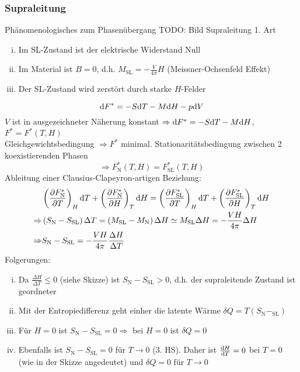 \subsubsection{Supraleitung}
Phänomenologisches zum Phasenübergang
TODO: Bild Supraleitung 1. Art  %
\begin{enumerate}[i)]
    \item Im SL-Zustand ist der elektrische Widerstand Null
    \item Im Material ist $B = 0$, d.h. $M_\text{SL} = - \frac{V}{4 \pi} H$ (Meissner-Ochsenfeld Effekt)
    \item Der SL-Zustand wird zerstört durch starke $H$-Felder
\end{enumerate}
\begin{equation}
    \mathrm{d} F^* = - S \mathrm{d} T - M \mathrm{d} H - p \mathrm{d} V
\end{equation}
$V$ ist in ausgezeichneter Näherung konstant $\Rightarrow \mathrm{d} F^* = - S \mathrm{d} T - M \mathrm{d} H$, $F^* = F^*(T, H)$ \\
Gleichgewichtsbedingung $\Rightarrow F^*$ minimal. Stationaritätsbedingung zwischen 2 koexistierenden Phasen
\begin{equation}
    \Rightarrow F_\text{N}^* (T, H) = F_\text{SL}^* (T, H)
\end{equation}
Ableitung einer Clausius-Clapeyron-artigen Beziehung:
\begin{equation}
    \begin{split}
        & \left( \frac{\partial F_\text{N}^*}{\partial T} \right)_{H} \mathrm{d} T + \left( \frac{\partial F_\text{N}^*}{\partial H} \right)_{T} \mathrm{d} H = \left( \frac{\partial F_\text{SL}^*}{\partial T} \right)_{H} \mathrm{d} T + \left( \frac{\partial F_\text{SL}^*}{\partial H} \right)_{T} \mathrm{d} H \\
        \Rightarrow & \left( S_\text{N} - S_\text{SL} \right) \Delta T = \left( M_\text{SL} - M_\text{N} \right) \Delta H \simeq M_\text{SL} \Delta H = - \frac{V H}{4 \pi} \Delta H \\
        \Rightarrow & S_\text{N} - S_\text{SL} = - \frac{V H}{4 \pi} \frac{\Delta H}{\Delta T}
    \end{split}
\end{equation}
Folgerungen:
\begin{enumerate}[i)]
    \item Da $\frac{\Delta H}{\Delta T} \leq 0$ (siehe Skizze) ist $S_\text{N} - S_\text{SL} > 0$, d.h. der supraleitende Zustand ist geordneter
    \item Mit der Entropiedifferenz geht einher die latente Wärme $\delta Q = T \left( S_\text{N} - _\text{SL} \right) $
    \item Für $H = 0$ ist $S_\text{N} - S_\text{SL} = 0 \Rightarrow $ bei $H = 0$ ist $\delta Q = 0$
    \item Ebenfalls ist $S_\text{N} - S_\text{SL} = 0$ für $T \to 0 $ (3. HS). Daher ist $\frac{\mathrm{d} H}{\mathrm{d} T} = 0$ bei $T = 0$ (wie in der Skizze angedeutet) und $\delta Q = 0$ für $T \to 0$
\end{enumerate}